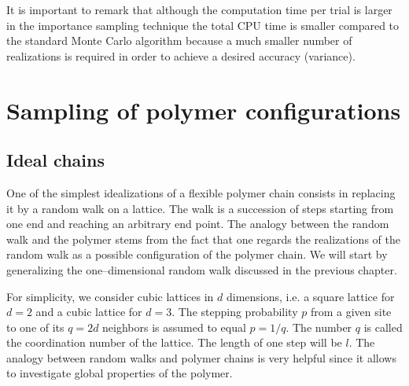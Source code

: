 It is important to remark that although the computation time per
trial is larger in the importance sampling technique the total CPU 
time is smaller compared to the standard Monte Carlo algorithm 
because a much smaller number of realizations is required in order
to achieve a desired accuracy (variance).

\section{Sampling of polymer configurations}
\subsection{Ideal chains}
One of the simplest idealizations of a flexible polymer chain 
consists in replacing it by a random walk on a lattice. The walk 
is a succession of steps starting from one end and reaching an 
arbitrary end point. The analogy between the random walk and the
polymer stems from the fact that one regards the realizations of 
the random walk as a possible configuration of the polymer chain.
We will start by generalizing the one--dimensional random walk
discussed in the previous chapter.

For simplicity, we consider cubic lattices in $d$ dimensions,
i.e. a square lattice for $d=2$ and a cubic lattice for $d=3$.
The stepping probability $p$ from a given site to one of its $q=2d$
neighbors  is assumed to equal $p=1/q$. The number $q$ is called
the coordination number of the lattice. The length of one step
will be $l$. The analogy between random walks and polymer chains 
is very helpful since it allows to investigate global properties 
of the polymer.

